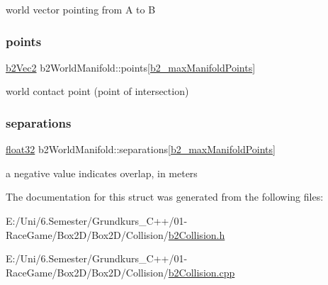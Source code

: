 world vector pointing from A to B 

\mbox{\label{structb2_world_manifold_af15e84b90f102c0ac433be2d63604021}} 
\subsubsection{\texorpdfstring{points}{points}}
{\footnotesize\ttfamily \mbox{\hyperlink{structb2_vec2}{b2\+Vec2}} b2\+World\+Manifold\+::points\mbox{[}\mbox{\hyperlink{b2_settings_8h_aa5f44cc9edf711433dea2b2ec94f3c42}{b2\+\_\+max\+Manifold\+Points}}\mbox{]}}



world contact point (point of intersection) 

\mbox{\label{structb2_world_manifold_ac545e60a52d219d53ef1de3e0cad2d84}} 
\subsubsection{\texorpdfstring{separations}{separations}}
{\footnotesize\ttfamily \mbox{\hyperlink{b2_settings_8h_aacdc525d6f7bddb3ae95d5c311bd06a1}{float32}} b2\+World\+Manifold\+::separations\mbox{[}\mbox{\hyperlink{b2_settings_8h_aa5f44cc9edf711433dea2b2ec94f3c42}{b2\+\_\+max\+Manifold\+Points}}\mbox{]}}



a negative value indicates overlap, in meters 



The documentation for this struct was generated from the following files\+:\begin{DoxyCompactItemize}
\item 
E\+:/\+Uni/6.\+Semester/\+Grundkurs\+\_\+\+C++/01-\/\+Race\+Game/\+Box2\+D/\+Box2\+D/\+Collision/\mbox{\hyperlink{b2_collision_8h}{b2\+Collision.\+h}}\item 
E\+:/\+Uni/6.\+Semester/\+Grundkurs\+\_\+\+C++/01-\/\+Race\+Game/\+Box2\+D/\+Box2\+D/\+Collision/\mbox{\hyperlink{b2_collision_8cpp}{b2\+Collision.\+cpp}}\end{DoxyCompactItemize}
